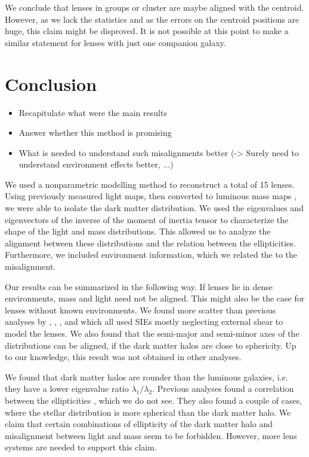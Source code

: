\documentclass[useAMS,usenatbib]{mn2e}
\begin{document}
We conclude that lenses in groups or cluster are maybe aligned with the centroid. However, as we lack the statistics and as the errors on the centroid positions are huge, this claim might be disproved. It is not possible at this point to make a similar statement for lenses with just one companion galaxy.


\section{Conclusion}\label{sec:conclusion}
\begin{itemize}
\item Recapitulate what were the main results
\item Answer whether this method is promising
\item What is needed to understand such misalignments better (-> Surely need to understand environment effects better, ...)
\end{itemize}

We used a nonparametric modelling method to reconstruct a total of 15 lenses. Using previously measured light maps, then converted to luminous mass maps \cite{leier11phd}, we were able to isolate the dark matter distribution. We used the eigenvalues and eigenvectors of the inverse of the moment of inertia tensor to characterize the shape of the light and mass distributions. This allowed us to analyze the alignment between these distributions and the relation between the ellipticities. Furthermore, we included environment information, which we related the to the misalignment.

Our results can be summarized in the following way. If lenses lie in dense environments, mass and light need not be aligned. This might also be the case for lenses without known environments. We found more scatter than previous analyses by \cite{1997ApJ...482..604K}, \cite{2006ApJ...649..599K}, \cite{2009ApJ...690..670T}, and \cite{2012ApJ...761..170G} which all used SIEs mostly neglecting external shear to model the lenses. We also found that the semi-major and semi-minor axes of the distributions can be aligned, if the dark matter halos are close to sphericity. Up to our knowledge, this result was not obtained in other analyses.

We found that dark matter halos are rounder than the luminous galaxies, i.e. they have a lower eigenvalue ratio $\lambda_{1}/\lambda_{2}$. Previous analyses found a correlation between the ellipticities \citep{2009ApJ...690..670T,2012ApJ...761..170G}, which we do not see. They also found a couple of cases, where the stellar distribution is more spherical than the dark matter halo. We claim that certain combinations of ellipticity of the dark matter halo and misalignment between light and mass seem to be forbidden. However, more lens systems are needed to support this claim.
\end{document}
